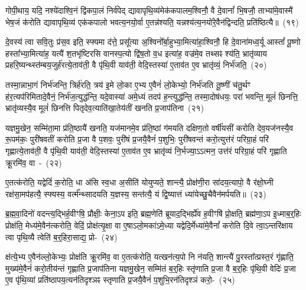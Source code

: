 गोपी॒थाय॒ यदि॒ नश्ये॑दाश्वि॒नं द्वि॑कपा॒लं निर्व॑पेद् द्यावा\-पृथि॒व्य॑मेक॑कपालम॒श्विनौ॒ वै दे॒वानां᳚ भि॒षजौ॒ ताभ्या॑मे॒वास्मै॑ भेष॒जं क॑रोति द्यावा\-पृथि॒व्य॑ एक॑कपालो भवत्य॒नयो॒र्वा ए॒तन्न॑श्यति॒ यन्नश्य॑त्य॒नयो॑रे॒वैन॑द्विन्दति॒ प्रति॑ष्ठित्यै॥~(१९)

{\anuvakamend[{प्रा॒जा॒प॒त्यन्ते\-ऽक्षो\-ऽनु॑पाक्तो वे॒देना॒\-ऽभि वा॑सयति॒ तस्मा॒द्यज॑मानस्य॒ द्वात्रिꣳ॑शच्च}]}%

दे॒वस्य॑ त्वा सवि॒तुः प्र॑स॒व इति॒ स्फ्यमा द॑त्ते॒ प्रसू᳚त्या अ॒श्विनो᳚र्बा॒हुभ्या॒मित्या॑हा॒श्विनौ॒ हि दे॒वाना॑मध्व॒र्यू आस्तां᳚ पू॒ष्णो हस्ता᳚भ्या॒मित्या॑ह॒ यत्यै॑ श॒तभृ॑ष्टिरसि वानस्प॒त्यो द्वि॑ष॒तो व॒ध इत्या॑ह॒ वज्र॑मे॒व तथ्सꣴ श्य॑ति॒ भ्रातृ॑व्याय प्रहरि॒ष्यन्थ्स्त॑म्बय॒जुर्\mbox{}ह॑रत्ये॒ताव॑ती॒ वै पृ॑थि॒वी याव॑ती॒ वेदि॒स्तस्या॑ ए॒ताव॑त ए॒व भ्रातृ॑व्यं॒ निर्भ॑जति॒~(२०)

तस्मा॒न्नाभा॒गं निर्भ॑जन्ति॒ त्रिर्\mbox{}ह॑रति॒ त्रय॑ इ॒मे लो॒का ए॒भ्य ए॒वैनं॑ लो॒केभ्यो॒ निर्भ॑जति तू॒ष्णीं च॑तु॒र्थꣳ ह॑र॒त्यप॑रिमितादे॒वैनं॒ निर्भ॑ज॒त्युद्ध॑न्ति॒ यदे॒वास्या॑ अमे॒ध्यं तदप॑ ह॒न्त्युद्ध॑न्ति॒ तस्मा॒दोष॑धयः॒ परा॑ भवन्ति॒ मूलं॑ छिनत्ति॒ भ्रातृ॑व्यस्यै॒व मूलं॑ छिनत्ति पितृदेव॒त्याति॑खा॒तेय॑तीं खनति प्र॒जा\-प॑तिना~(२१)

यज्ञमु॒खेन॒ सम्मि॑ता॒मा प्र॑ति॒ष्ठायै॑ खनति॒ यज॑मानमे॒व प्र॑ति॒ष्ठां ग॑मयति दक्षिण॒तो वर्\mbox{}षी॑यसीं करोति देव॒यज॑नस्यै॒व रू॒पम॑कः॒ पुरी॑षवतीं करोति प्र॒जा वै प॒शवः॒ पुरी॑षं प्र॒जयै॒वैनं॑ प॒शुभिः॒ पुरी॑षवन्तं करो॒त्युत्त॑रं परिग्रा॒हं परि॑ गृह्णात्ये॒ताव॑ती॒ वै पृ॑थि॒वी याव॑ती॒ वेदि॒स्तस्या॑ ए॒ताव॑त ए॒व भ्रातृ॑व्यं नि॒र्भज्या॒\-ऽऽ\-त्मन॒ उत्त॑रं परिग्रा॒हं परि॑ गृह्णाति क्रू॒रमि॑व॒ वा~-~(२२)

ए॒तत्क॑रोति॒ यद्वेदिं॑ क॒रोति॒ धा अ॑सि स्व॒धा अ॒सीति॑ योयुप्यते॒ शान्त्यै॒ प्रोक्ष॑णी॒रा सा॑दय॒त्यापो॒ वै र॑क्षो॒घ्नी रक्ष॑सा॒मप॑हत्यै॒ स्फ्यस्य॒ वर्त्म᳚न्थ्सादयति य॒ज्ञस्य॒ सन्त॑त्यै॒ यं द्वि॒ष्यात्तं ध्या॑येच्छु॒चैवैन॑मर्पयति॥~(२३)

{\anuvakamend[{भ॒ज॒ति॒ प्र॒जा\-प॑तिनेव॒ वै त्रय॑स्त्रिꣳशच्च}]}%

ब्र॒ह्म॒वा॒दिनो॑ वदन्त्य॒द्भिर्\mbox{}ह॒वीꣳषि॒ प्रौक्षीः॒ केना॒\-ऽप इति॒ ब्रह्म॒णेति॑ ब्रूयाद॒द्भिर्\mbox{}ह्ये॑व ह॒वीꣳषि॑ प्रो॒क्षति॒ ब्रह्म॑णा॒\-ऽप इ॒ध्माब॒र्॒\mbox{}हिः प्रोक्ष॑ति॒ मेध्य॑मे॒वैन॑त्करोति॒ वेदिं॒ प्रोक्ष॑त्यृ॒क्षा वा ए॒षा\-ऽलो॒मका॑\-ऽमे॒ध्या यद्वेदि॒र्मेध्या॑मे॒वैनां᳚ करोति दि॒वे त्वा॒\-ऽ\-न्तरि॑क्षाय त्वा पृथि॒व्यै त्वेति॑ ब॒र्॒\mbox{}हिरा॒साद्य॒ प्रो-~(२४)

क्ष॑त्ये॒भ्य ए॒वैन॑ल्लो॒केभ्यः॒ प्रोक्ष॑ति क्रू॒रमि॑व॒ वा ए॒तत्क॑रोति॒ यत्खन॑त्य॒पो नि न॑यति॒ शान्त्यै॑ पु॒रस्ता᳚त्प्रस्त॒रं गृ॑ह्णाति॒ मुख्य॑मे॒वैनं॑ करो॒तीय॑न्तं गृह्णाति प्र॒जा\-प॑तिना यज्ञमु॒खेन॒ सम्मि॑तं ब॒र्॒\mbox{}हिः स्तृ॑णाति प्र॒जा वै ब॒र्॒\mbox{}हिः पृ॑थि॒वी वेदिः॑ प्र॒जा ए॒व पृ॑थि॒व्यां प्रति॑\-ष्ठा\-पय॒त्यन॑ति\-दृश्ञꣴ स्तृणाति प्र॒जयै॒वैनं॑ प॒शुभि॒रन॑तिदृश्ञं करो॒-~(२५)

